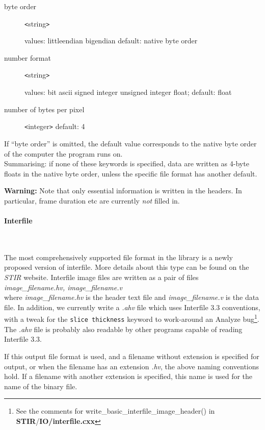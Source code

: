 \documentclass{article}
\newcommand{\subsubsubsection}[1]{\paragraph{#1}\mbox{} \\}
\begin{document}
{{\begin{description}
\item[byte order] \texttt{<}string\texttt{>}\linebreak
\raggedright
 values: littleendian {\textbar} bigendian\linebreak
 default: native byte order

\item[number format] \texttt{<}string\texttt{>}\linebreak
\raggedright
 values: bit {\textbar} ascii 
{\textbar} signed integer {\textbar} 
 unsigned integer {\textbar} float;\linebreak
default: float
\item[number of bytes per pixel] \texttt{<}integer\texttt{>}\linebreak
 default: 4
\end{description}


If ``byte order'' is omitted, the default value corresponds to 
the native byte order of the computer the program runs on.\\
Summarising: if none of these keywords is specified, data are 
written as 4-byte floats in the native byte order, unless the 
specific file format has another default.



\textbf{Warning:} Note that only essential information is written 
in the headers. In particular, frame duration etc are currently \textit{not} 
filled in.

{ \subsubsubsection{Interfile}
}
\label{sec:outputinterfile}
The most comprehensively supported file format in the library 
is a newly proposed version of interfile. More details about 
this type can be found on the \textit{STIR} website.
Interfile image files are written as a pair of files
\textit{image\_filename.hv,
image\_filename.v}\\
where \textit{image\_filename.hv} is the header text file and \textit{image\_filename.v} 
is the data file. In addition, we currently write a \textit{.ahv} 
file which uses Interfile 3.3 conventions, with a tweak for the 
\texttt{slice thickness} keyword to work-around an Analyze\texttrademark{} 
bug\footnote{See the comments for write\_basic\_interfile\_image\_header() 
in \textbf{STIR}/\textbf{IO/interfile.cxx}}. The \textit{.ahv} file is probably 
also readable by other programs capable of reading Interfile 
3.3.


If this output file format is used, and a filename without extension 
is specified for output, or when the filename has an extension \textit{.hv}, 
the above naming conventions hold. If a filename with another 
extension is specified, this name is used for the name of the 
binary file. 


}}
\end{document}
